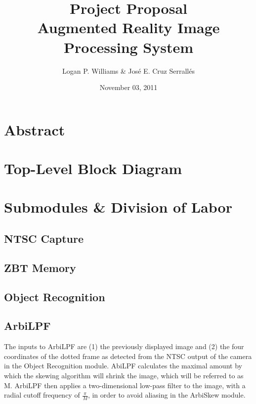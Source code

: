 \documentclass[11pt]{article}
\begin{document}
\title{Project Proposal\\Augmented Reality Image Processing System}
\author{Logan P. Williams \& Jos\'{e} E. Cruz Serrall\'{e}s}
\date{November 03, 2011}
\maketitle

\section{Abstract}

\section{Top-Level Block Diagram}

\section{Submodules \& Division of Labor}
\subsection{NTSC Capture}

\subsection{ZBT Memory}

\subsection{Object Recognition}

\subsection{ArbiLPF}
The inputs to ArbiLPF are (1) the previously displayed image and (2) the four coordinates of the dotted frame as detected from the NTSC output of the camera in the Object Recognition module. AbiLPF calculates the maximal amount by which the skewing algorithm will shrink the image, which will be referred to as M. ArbiLPF then applies a two-dimensional low-pass filter to the image, with a radial cutoff frequency of \( \frac{\pi}{M} \), in order to avoid aliasing in the ArbiSkew module.
\end{document}
